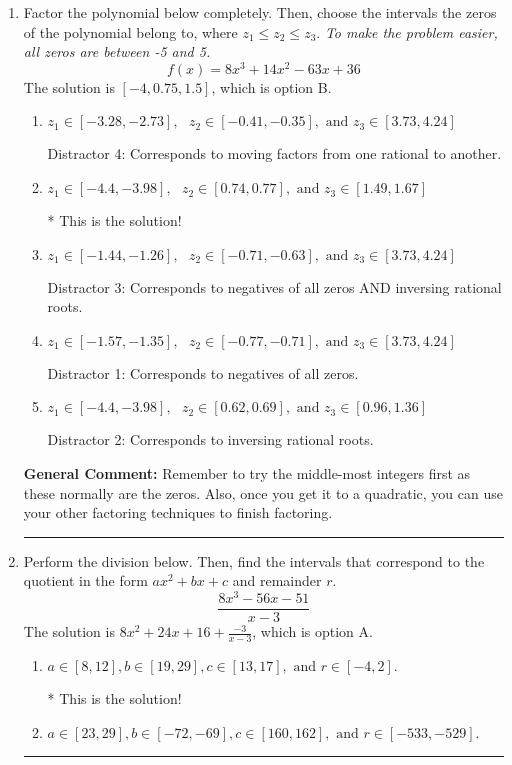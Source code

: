 \documentclass{extbook}[14pt]
\newcommand{\litem}[1]{\item #1

\rule{\textwidth}{0.4pt}}
\begin{document}
\begin{enumerate}\litem{
Factor the polynomial below completely. Then, choose the intervals the zeros of the polynomial belong to, where $z_1 \leq z_2 \leq z_3$. \textit{To make the problem easier, all zeros are between -5 and 5.}
\[ f(x) = 8x^{3} +14 x^{2} -63 x + 36 \]The solution is \( [-4, 0.75, 1.5] \), which is option B.\begin{enumerate}[label=\Alph*.]
\item \( z_1 \in [-3.28, -2.73], \text{   }  z_2 \in [-0.41, -0.35], \text{   and   } z_3 \in [3.73, 4.24] \)

 Distractor 4: Corresponds to moving factors from one rational to another.
\item \( z_1 \in [-4.4, -3.98], \text{   }  z_2 \in [0.74, 0.77], \text{   and   } z_3 \in [1.49, 1.67] \)

* This is the solution!
\item \( z_1 \in [-1.44, -1.26], \text{   }  z_2 \in [-0.71, -0.63], \text{   and   } z_3 \in [3.73, 4.24] \)

 Distractor 3: Corresponds to negatives of all zeros AND inversing rational roots.
\item \( z_1 \in [-1.57, -1.35], \text{   }  z_2 \in [-0.77, -0.71], \text{   and   } z_3 \in [3.73, 4.24] \)

 Distractor 1: Corresponds to negatives of all zeros.
\item \( z_1 \in [-4.4, -3.98], \text{   }  z_2 \in [0.62, 0.69], \text{   and   } z_3 \in [0.96, 1.36] \)

 Distractor 2: Corresponds to inversing rational roots.
\end{enumerate}

\textbf{General Comment:} Remember to try the middle-most integers first as these normally are the zeros. Also, once you get it to a quadratic, you can use your other factoring techniques to finish factoring.
}
\litem{
Perform the division below. Then, find the intervals that correspond to the quotient in the form $ax^2+bx+c$ and remainder $r$.
\[ \frac{8x^{3} -56 x -51}{x -3} \]The solution is \( 8x^{2} +24 x + 16 + \frac{-3}{x -3} \), which is option A.\begin{enumerate}[label=\Alph*.]
\item \( a \in [8, 12], b \in [19, 29], c \in [13, 17], \text{ and } r \in [-4, 2]. \)

* This is the solution!
\item \( a \in [23, 29], b \in [-72, -69], c \in [160, 162], \text{ and } r \in [-533, -529]. \)


\end{enumerate}}
\end{enumerate}
\end{document}
